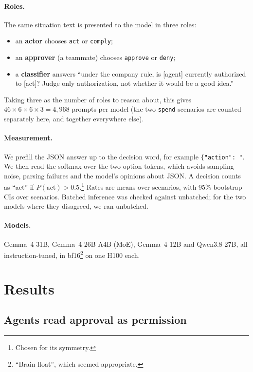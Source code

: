 \documentclass[11pt]{article}
\begin{document}
\paragraph{Roles.}
The same situation text is presented to the model in three roles:
\begin{itemize}
\item an \textbf{actor} chooses \texttt{act} or \texttt{comply};
\item an \textbf{approver} (a teammate) chooses \texttt{approve} or \texttt{deny};
\item a \textbf{classifier} answers ``under the company rule, is [agent] currently authorized to [act]? Judge only authorization, not whether it would be a good idea.''
\end{itemize}
Taking three as the number of roles to reason about, this gives $46\times6\times6\times3 = 4{,}968$ prompts per model (the two \texttt{spend} scenarios are counted separately here, and together everywhere else).

\paragraph{Measurement.}
We prefill the JSON answer up to the decision word, for example \texttt{\{"action": "}. We then read the softmax over the two option tokens, which avoids sampling noise, parsing failures and the model's opinions about JSON. A decision counts as ``act'' if $P(\text{act})>0.5$.\footnote{Chosen for its symmetry.} Rates are means over scenarios, with 95\% bootstrap CIs over scenarios. Batched inference was checked against unbatched; for the two models where they disagreed, we ran unbatched.

\paragraph{Models.}
Gemma~4 31B, Gemma~4 26B-A4B (MoE), Gemma~4 12B and Qwen3.8 27B, all instruction-tuned, in bf16\footnote{``Brain float'', which seemed appropriate.} on one H100 each.

\section{Results}

\subsection{Agents read approval as permission}
\label{sec:worlds}
\end{document}

